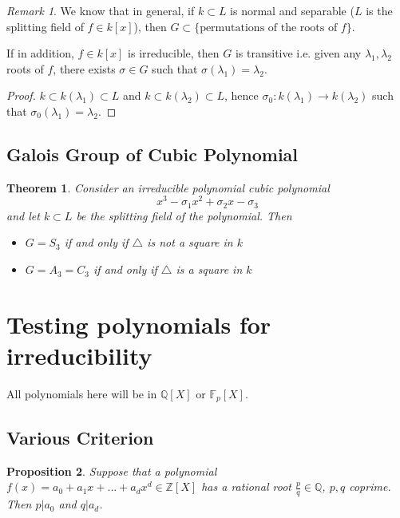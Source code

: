 \documentclass{article}
\theoremstyle{definition}
\theoremstyle{plain}%
\newtheorem{thm}{Theorem}[section]
\newtheorem{prop}[thm]{Proposition}
\theoremstyle{remark}
\newtheorem*{rem}{Remark}
\newcommand{\Q}{\mathbb{Q}}
\newcommand{\Z}{\mathbb{Z}}
\newcommand{\F}{\mathbb{F}}
\begin{document}
\begin{rem}
    We know that in general, if $k \subset L$ is normal and separable ($L$ is the splitting field of $f \in k[x]$), then $G \subset \{\text{permutations of the roots of }f\}$.

If in addition, $f \in k[x]$ is irreducible, then $G$ is transitive i.e. given any $\lambda_1, \lambda_2$ roots of $f$, there exists $\sigma \in G$ such that $\sigma(\lambda_1) = \lambda_2$.
\end{rem}

\begin{proof}
    $k \subset k(\lambda_1) \subset L$ and $k \subset k(\lambda_2) \subset L$, hence $\sigma_0 : k(\lambda_1) \to k(\lambda_2)$ such that $\sigma_0(\lambda_1) = \lambda_2$.
\end{proof}

\subsection{Galois Group of Cubic Polynomial}

\begin{thm}
    Consider an irreducible polynomial cubic polynomial
    \[x^3 - \sigma_1 x^2 + \sigma_2 x - \sigma_3\]
    and let $k \subset L$ be the splitting field of the polynomial. Then
    \begin{itemize}
        \item $G = S_3$ if and only if $\triangle$ is not a square in $k$
        \item $G = A_3 = C_3$ if and only if $\triangle$ is a square in $k$
    \end{itemize}
\end{thm}

\section{Testing polynomials for irreducibility}

All polynomials here will be in $\Q[X]$ or $\F_p[X]$.

\subsection{Various Criterion}

\begin{prop}
    Suppose that a polynomial $f(x) = a_0 + a_1x + ... + a_d x^d \in \Z[X]$ has a rational root $\frac{p}{q} \in \Q$, $p,q$ coprime. Then $p | a_0$ and $q | a_d$.
\end{prop}
\end{document}
